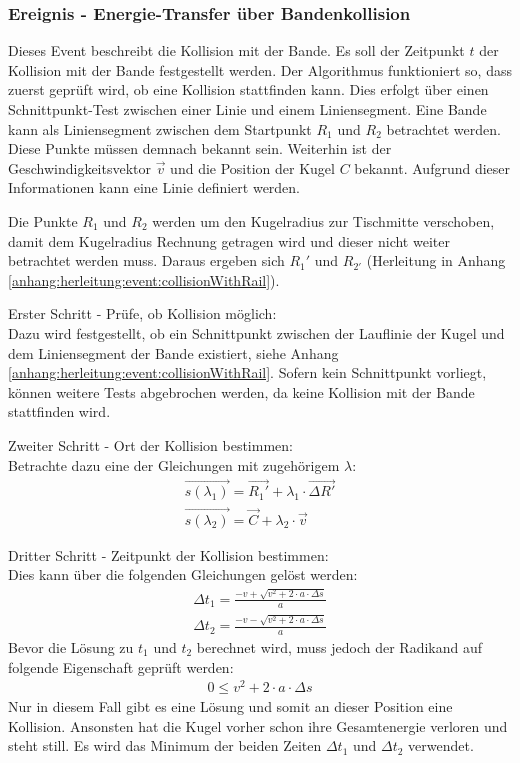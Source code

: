 \subsubsection{Ereignis - Energie-Transfer über Bandenkollision}
Dieses Event beschreibt die Kollision mit der Bande. Es soll der Zeitpunkt $t$ der Kollision mit der Bande festgestellt werden.
Der Algorithmus funktioniert so, dass zuerst geprüft wird, ob eine Kollision stattfinden kann.
Dies erfolgt über einen Schnittpunkt-Test zwischen einer Linie und einem Liniensegment.
Eine Bande kann als Liniensegment zwischen dem Startpunkt $R_1$ und $R_2$ betrachtet werden. Diese Punkte müssen demnach bekannt sein.
Weiterhin ist der Geschwindigkeitsvektor $\vec{v}$ und die Position der Kugel $C$ bekannt.
Aufgrund dieser Informationen kann eine Linie definiert werden.

Die Punkte $R_1$ und $R_2$ werden um den Kugelradius zur Tischmitte verschoben,
damit dem Kugelradius Rechnung getragen wird und dieser nicht weiter betrachtet werden muss.
Daraus ergeben sich $R_1'$ und $R_{2'}$ (Herleitung in Anhang \ref{anhang:herleitung:event:collisionWithRail}).

Erster Schritt - Prüfe, ob Kollision möglich:\\
Dazu wird festgestellt, ob ein Schnittpunkt zwischen der Lauflinie der Kugel und dem Liniensegment der
Bande existiert, siehe Anhang \ref{anhang:herleitung:event:collisionWithRail}.
Sofern kein Schnittpunkt vorliegt, können weitere Tests abgebrochen werden, da keine Kollision mit der Bande stattfinden wird.

Zweiter Schritt - Ort der Kollision bestimmen:\\
Betrachte dazu eine der Gleichungen mit zugehörigem $\lambda$:
\begin{align}
    \vec{s(\lambda_1)} = \vec{R_1'} + \lambda_1 \cdot \vec{\Delta R'}\\
    \vec{s(\lambda_2)} = \vec{C} + \lambda_2 \cdot \vec{v}
\end{align}

Dritter Schritt - Zeitpunkt der Kollision bestimmen:\\
Dies kann über die folgenden Gleichungen gelöst werden:
\begin{align}
    \Delta t_1 = \frac{-v + \sqrt{v^2 + 2 \cdot a \cdot \Delta s}}{a}\\
    \Delta t_2 = \frac{-v - \sqrt{v^2 + 2 \cdot a \cdot \Delta s}}{a}
\end{align}
Bevor die Lösung zu $t_1$ und $t_2$ berechnet wird, muss jedoch der Radikand auf folgende Eigenschaft geprüft werden:
\begin{align}
    0 \leq v^2 + 2 \cdot a \cdot \Delta s
\end{align}
Nur in diesem Fall gibt es eine Lösung und somit an dieser Position eine Kollision. Ansonsten hat die Kugel vorher schon
ihre Gesamtenergie verloren und steht still. Es wird das Minimum der beiden Zeiten $\Delta t_1$ und $\Delta t_2$ verwendet.

